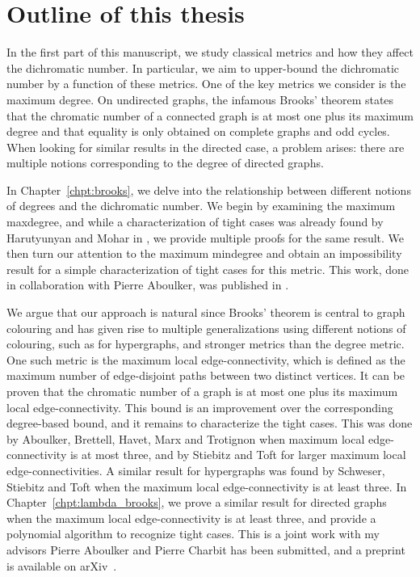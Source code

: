 \section{Outline of this thesis}

\bigskip
In the first part of this manuscript, we study classical metrics and how they affect the dichromatic number. In particular, we aim to upper-bound the dichromatic number by a function of these metrics. One of the key metrics we consider is the maximum degree. On undirected graphs, the infamous Brooks' theorem \cite{B41} states that the chromatic number of a connected graph is at most one plus its maximum degree and that equality is only obtained on complete graphs and odd cycles. When looking for similar results in the directed case, a problem arises: there are multiple notions corresponding to the degree of directed graphs.

\medskip
In Chapter~\ref{chpt:brooks}, we delve into the relationship between different notions of degrees and the dichromatic number. We begin by examining the maximum maxdegree, and while a characterization of tight cases was already found by Harutyunyan and Mohar in \cite{HMGallai}, we provide multiple proofs for the same result. We then turn our attention to the maximum mindegree and obtain an impossibility result for a simple characterization of tight cases for this metric. This work, done in collaboration with Pierre Aboulker, was published in \cite{AA22}.

\medskip
We argue that our approach is natural since Brooks' theorem is central to graph colouring and has given rise to multiple generalizations using different notions of colouring, such as \cite{RPJ75} for hypergraphs, and stronger metrics than the degree metric. One such metric is the maximum local edge-connectivity, which is defined as the maximum number of edge-disjoint paths between two distinct vertices. It can be proven that the chromatic number of a graph is at most one plus its maximum local edge-connectivity. This bound is an improvement over the corresponding degree-based bound, and it remains to characterize the tight cases. This was done by Aboulker, Brettell, Havet, Marx and Trotignon \cite{ABHMT17} when maximum local edge-connectivity is at most three, and by Stiebitz and Toft \cite{ST16} for larger maximum local edge-connectivities. A similar result for hypergraphs was found by Schweser, Stiebitz and Toft \cite{SST22} when the maximum local edge-connectivity is at least three. In Chapter~\ref{chpt:lambda_brooks}, we prove a similar result for directed graphs when the maximum local edge-connectivity is at least three, and provide a polynomial algorithm to recognize tight cases. This is a joint work with my advisors Pierre Aboulker and Pierre Charbit has been submitted, and a preprint is available on arXiv~\cite{AAC23}.

